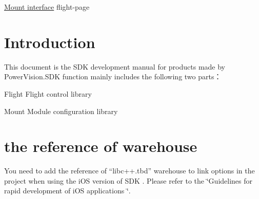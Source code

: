 \hyperlink{mount-page}{Mount interface} flight-\/page\hypertarget{index_Brief}{}\section{Introduction}\label{index_Brief}
This document is the S\+DK development manual for products made by Power\+Vision.\+S\+DK function mainly includes the following two parts：

\begin{DoxyItemize}
\item Flight Flight control library \item Mount Module configuration library\end{DoxyItemize}
\hypertarget{index_About}{}\section{the reference of warehouse}\label{index_About}
You need to add the reference of “libc++.tbd” warehouse to link options in the project when using the i\+OS version of S\+DK . Please refer to the \char`\"{}\+Guidelines for rapid development of i\+O\+S applications \char`\"{}. 